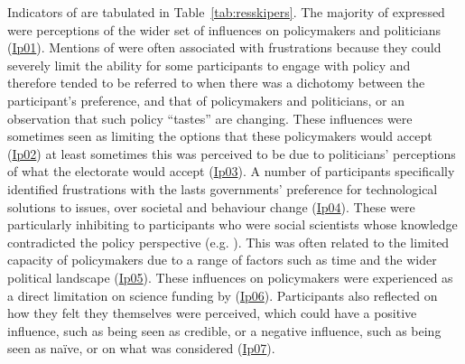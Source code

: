 Indicators of \skipers{} are tabulated in Table~\ref{tab:resskipers}. The majority of \skipers{} expressed were perceptions of the wider set of influences on policymakers and politicians (\hyperref[tab:resskipers]{Ip01}). Mentions of \skipers{} were often associated with frustrations because they could severely limit the ability for some participants to engage with policy and therefore  tended to be referred to when there was a dichotomy between the participant's preference, and that of policymakers and politicians, or an observation that such policy ``tastes'' are changing. These influences were sometimes seen as limiting the options that these policymakers would accept (\hyperref[tab:resskipers]{Ip02}) at least sometimes this was perceived to be due to politicians' perceptions of what the electorate would accept (\hyperref[tab:resskipers]{Ip03}). A number of participants specifically identified frustrations with the lasts governments' preference for technological solutions to \CAN{} issues, over societal and behaviour change (\hyperref[tab:resskipers]{Ip04}). These were particularly inhibiting to participants who were social scientists whose knowledge contradicted the policy perspective (e.g. ). This was often related to the limited capacity of policymakers due to a range of factors such as time and the wider political landscape (\hyperref[tab:resskipers]{Ip05}). These influences on policymakers were experienced as a direct limitation on science funding by  (\hyperref[tab:resskipers]{Ip06}). Participants also reflected on how they felt they themselves were perceived, which could have a positive influence, such as being seen as credible, or a negative influence, such as being seen as na\"ive, or on what was considered  (\hyperref[tab:resskipers]{Ip07}).

